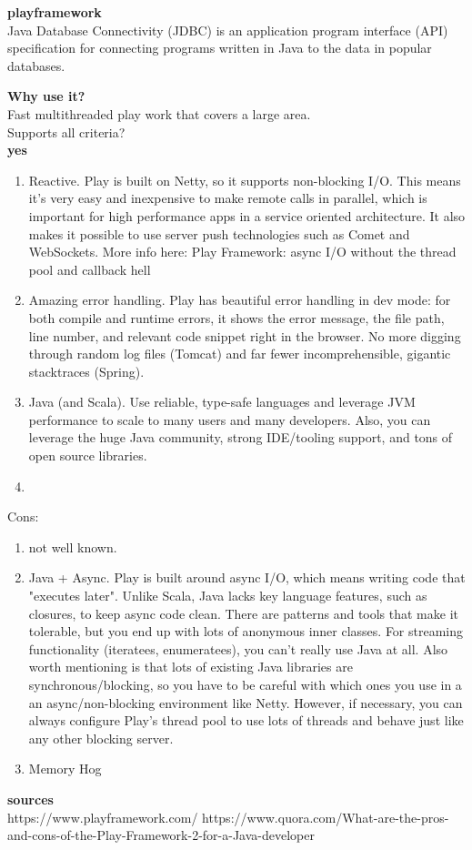 
\textbf{playframework} \\
Java Database Connectivity (JDBC) is an application program interface (API) specification for connecting programs written in Java to the data in popular databases.

\textbf{Why use it?} \\
Fast multithreaded play work that covers a large area.\\

Supports all criteria? \\
\textbf{yes}

\begin{enumerate}
	\item Reactive. Play is built on Netty, so it supports non-blocking I/O. This means it's very easy and inexpensive to make remote calls in parallel, which is important for high performance apps in a service oriented architecture. It also makes it possible to use server push technologies such as Comet and WebSockets. More info here: Play Framework: async I/O without the thread pool and callback hell 
	\item Amazing error handling. Play has beautiful error handling in dev mode: for both compile and runtime errors, it shows the error message, the file path, line number, and relevant code snippet right in the browser. No more digging through random log files (Tomcat) and far fewer incomprehensible, gigantic stacktraces (Spring).
	\item Java (and Scala). Use reliable, type-safe languages and leverage JVM performance to scale to many users and many developers. Also, you can leverage the huge Java community, strong IDE/tooling support, and tons of open source libraries.
	\item 
\end{enumerate}
Cons:
\begin{enumerate}
	\item not well known.
	\item Java + Async. Play is built around async I/O, which means writing code that "executes later". Unlike Scala, Java lacks key language features, such as closures, to keep async code clean. There are patterns and tools that make it tolerable, but you end up with lots of anonymous inner classes. For streaming functionality (iteratees, enumeratees), you can't really use Java at all. Also worth mentioning is that lots of existing Java libraries are synchronous/blocking, so you have to be careful with which ones you use in a an async/non-blocking environment like Netty. However, if necessary, you can always configure Play's thread pool to use lots of threads and behave just like any other blocking server.
	\item Memory Hog
\end{enumerate}

\textbf{sources} \\
https://www.playframework.com/
https://www.quora.com/What-are-the-pros-and-cons-of-the-Play-Framework-2-for-a-Java-developer